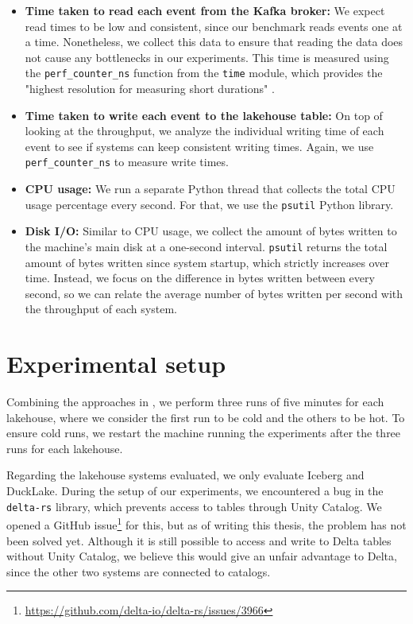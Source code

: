 \begin{itemize}
	\item \textbf{Time taken to read each event from the Kafka broker:} We expect read times to be low and consistent, since our benchmark reads events one at a time. Nonetheless, we collect this data to ensure that reading the data does not cause any bottlenecks in our experiments. This time is measured using the \verb*|perf_counter_ns| function from the \verb*|time| module, which provides the "highest resolution for measuring short durations" \cite{TimeTimeAccess}.
	
	\item \textbf{Time taken to write each event to the lakehouse table:} On top of looking at the throughput, we analyze the individual writing time of each event to see if systems can keep consistent writing times. Again, we use \verb*|perf_counter_ns| to measure write times.
	
	\item \textbf{CPU usage:} We run a separate Python thread that collects the total CPU usage percentage every second. For that, we use the \verb*|psutil| \cite{giampaolorodolaPsutil2026} Python library.
	
	\item\textbf{ Disk I/O:} Similar to CPU usage, we collect the amount of bytes written to the machine's main disk at a one-second interval. \verb*|psutil| returns the total amount of bytes written since system startup, which strictly increases over time. Instead, we focus on the difference in bytes written between every second, so we can relate the average number of bytes written per second with the throughput of each system.
\end{itemize}


\section{Experimental setup}
Combining the approaches in \cite{henningTheodoliteScalabilityBenchmarking2021, henningShuffleBenchBenchmarkLargeScale2024}, we perform three runs of five minutes for each lakehouse, where we consider the first run to be cold and the others to be hot. To ensure cold runs, we restart the machine running the experiments after the three runs for each lakehouse. 

Regarding the lakehouse systems evaluated, we only evaluate Iceberg and DuckLake. During the setup of our experiments, we encountered a bug in the \verb*|delta-rs| library, which prevents access to tables through Unity Catalog. We opened a GitHub issue\footnote{\url{https://github.com/delta-io/delta-rs/issues/3966}} for this, but as of writing this thesis, the problem has not been solved yet. Although it is still possible to access and write to Delta tables without Unity Catalog, we believe this would give an unfair advantage to Delta, since the other two systems are connected to catalogs.

